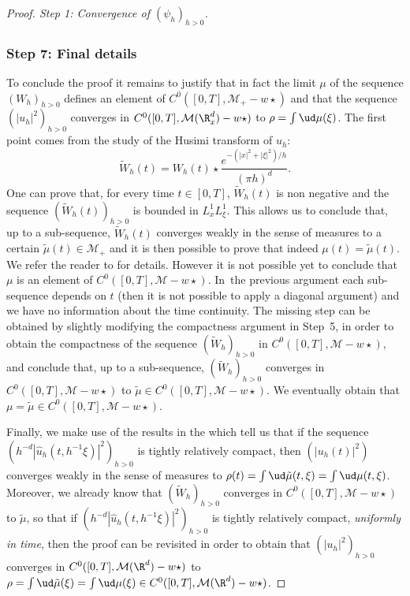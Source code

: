 \begin{proof}[Proof. Step 1: Convergence of $(\psi_{h})_{h>0}$]
\subsubsection*{Step 7: Final details} To conclude the proof it remains to justify that in fact the limit $\mu$ of the sequence $(W_{h})_{h>0}$ defines an element of $C^{0}([0,T],\mathcal{M}_+-w\star)$ and that the sequence $(|u_{h}|^{2})_{h>0}$ converges in $C^{0}([0,T],\mathcal{M}(\R_{x}^{d})-w\star)$ to $\rho=\int\ud\mu(\xi)$. The first point comes from the study of the Husimi transform of $u_{h}$:
\[
\widetilde{W}_{h}(t)=W_{h}(t)\star\frac{e^{-(|x|^{2}+|\xi|^{2})/h}}{(\pi h)^{d}}.
\]
One can prove that, for every time $t\in[0,T]$, $\widetilde{W}_{h}(t)$ is non negative and the \hbox{sequence} $(\widetilde{W}_{h}(t))_{h>0}$ is bounded in $L_{x}^{1}L_{\xi}^{1}$. This allows us to conclude that, up to a sub-sequence, $\widetilde{W}_{h}(t)$ converges weakly in the sense of measures to a certain $\tilde{\mu}(t)\in\mathcal{M}_+$ and it is then possible to prove that indeed $\mu(t)=\tilde{\mu}(t)$. We refer the reader to \cite[\S III]{Lions_Paul_Wigner} for details. However it is not possible yet to conclude that $\mu$ is an element of $C^{0}([0,T],\mathcal{M}-w\star)$. In~the previous argument each sub-sequence depends on $t$ (then it is not possible to apply a diagonal argument) and we have no information about the time continuity. The missing step can be obtained by slightly modifying the compactness argument in Step~5, in order to obtain the compactness of the sequence $(\widetilde{W}_{h})_{h>0}$ in \hbox{$C^{0}([0,T],\mathcal{M}-w\star)$}, and conclude that, up to a sub-sequence, $(\widetilde{W}_{h})_{h>0}$ converges in \hbox{$C^{0}([0,T],\mathcal{M}-w\star)$} to $\tilde{\mu}\in C^{0}([0,T],\mathcal{M}-w\star)$. We eventually obtain that $\mu=\tilde{\mu}\in C^{0}([0,T],\mathcal{M}-w\star)$.

Finally, we make use of the results in the \cite[\S III ]{Lions_Paul_Wigner} which tell us that
if the sequence $(h^{-d}|\hat{u}_{h}(t,h^{-1}\xi)|^{2})_{h>0}$ is tightly relatively compact, then $(|u_{h}(t)|^{2})$ converges weakly in the sense of measures to $\rho(t)=\int\ud\tilde{\mu}(t,\xi)=\int\ud\mu(t,\xi)$.
Moreover, we already know that $(\widetilde{W}_{h})_{h>0}$ converges in $C^{0}([0,T],\mathcal{M}-w\star)$ to $\tilde{\mu}$, so that if $(h^{-d}|\hat{u}_{h}(t,h^{-1}\xi)|^{2})_{h>0}$ is tightly relatively compact, \emph{uniformly in time},
then the proof \cite[Th.\,III.1(3)]{Lions_Paul_Wigner} can be revisited in order to obtain that $(|u_{h}|^{2})_{h>0}$ converges in $C^{0}([0,T],\mathcal{M}(\R^{d})-w\star)$ to $\rho=\int\ud\tilde{\mu}(\xi)=\int\ud\mu(\xi)\in C^{0}([0,T],\mathcal{M}(\R^{d})-w\star)$.


\end{proof}
